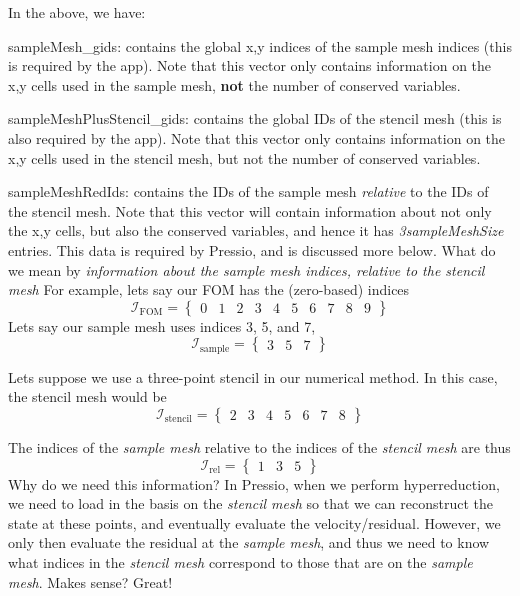 In the above, we have\+:
\begin{DoxyEnumerate}
\item {\ttfamily sample\+Mesh\+\_\+gids}\+: contains the global x,y indices of the sample mesh indices (this is required by the app). Note that this vector only contains information on the x,y cells used in the sample mesh, {\bfseries{not}} the number of conserved variables.
\item {\ttfamily sample\+Mesh\+Plus\+Stencil\+\_\+gids}\+: contains the global I\+Ds of the stencil mesh (this is also required by the app). Note that this vector only contains information on the x,y cells used in the stencil mesh, but not the number of conserved variables.
\item {\ttfamily sample\+Mesh\+Red\+Ids}\+: contains the I\+Ds of the sample mesh {\itshape relative} to the I\+Ds of the stencil mesh. Note that this vector will contain information about not only the x,y cells, but also the conserved variables, and hence it has {\itshape 3sample\+Mesh\+Size} entries. This data is required by Pressio, and is discussed more below. What do we mean by {\itshape information about the sample mesh indices, relative to the stencil mesh} For example, let\textquotesingle{}s say our F\+OM has the (zero-\/based) indices \[ \mathcal{I}_{\text{FOM}} = \begin{Bmatrix} 0& 1 & 2 & 3 & 4 & 5 & 6 & 7 & 8 & 9 \end{Bmatrix}\] Let\textquotesingle{}s say our sample mesh uses indices 3, 5, and 7, \[ \mathcal{I}_{\text{sample}} = \begin{Bmatrix} 3 & 5 & 7 \end{Bmatrix}\]
\end{DoxyEnumerate}

Let\textquotesingle{}s suppose we use a three-\/point stencil in our numerical method. In this case, the stencil mesh would be \[ \mathcal{I}_{\text{stencil}} = \begin{Bmatrix} 2& 3 & 4& 5 &6 & 7 & 8\end{Bmatrix}\]

The indices of the {\itshape sample mesh} relative to the indices of the {\itshape stencil mesh} are thus \[ \mathcal{I}_{\text{rel}} =\begin{Bmatrix} 1 & 3 & 5 \end{Bmatrix}\] Why do we need this information? In Pressio, when we perform hyperreduction, we need to load in the basis on the {\itshape stencil mesh} so that we can reconstruct the state at these points, and eventually evaluate the velocity/residual. However, we only then evaluate the residual at the {\itshape sample mesh}, and thus we need to know what indices in the {\itshape stencil mesh} correspond to those that are on the {\itshape sample mesh}. Makes sense? Great!


